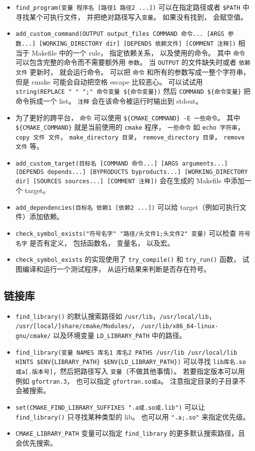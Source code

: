 \begin{itemize}
\item \verb`find_program(变量 程序名 [路径1 路径2 ...])` 可以在指定路径或者 \verb`$PATH` 中寻找某个可执行文件， 并把绝对路径写入\verb`变量`。 如果没有找到， 会赋空值。
\item \verb`add_custom_command(OUTPUT output_files COMMAND 命令... [ARGS 参数...] [WORKING_DIRECTORY dir] [DEPENDS 依赖文件] [COMMENT 注释])` 相当于 Makefile 中的一个 rule， 指定依赖关系， 以及使用的命令。 其中 \verb`命令` 可以包含完整的命令而不需要额外用 \verb`参数`。 当 \verb`OUTPUT` 的文件缺失时或者 \verb`依赖文件` 更新时， 就会运行命令。 可以把 \verb`命令` 和所有的参数写成一整个字符串， 但是 cmake 可能会自动把空格 escape 比较恶心。 可以试试用 \verb`string(REPLACE " " ";" 命令变量 ${命令变量})` 然后 \verb`COMMAND ${命令变量}` 把命令拆成一个 list。 \verb`注释` 会在该命令被运行时输出到 stdout。
\item 为了更好的跨平台， \verb`命令` 可以使用 \verb`${CMAKE_COMMAND} -E 一些命令`。 其中 \verb`${CMAKE_COMMAND}` 就是当前使用的 \verb`cmake` 程序， \verb`一些命令` 如 \verb`echo 字符串`，\verb`copy 文件 文件`， \verb`make_directory 目录`， \verb`remove_directory 目录`， \verb`remove 文件` 等。
\item \verb`add_custom_target(目标名 [COMMAND 命令...] [ARGS arguments...] [DEPENDS depends...] [BYPRODUCTS byproducts...] [WORKING_DIRECTORY dir] [SOURCES sources...] [COMMENT 注释])` 会在生成的 Makefile 中添加一个 target。
\item \verb`add_dependencies(目标名 依赖1 [依赖2 ...])` 可以给 target（例如可执行文件）添加依赖。
\item \verb`check_symbol_exists("符号名字" "路径/头文件1;头文件2" 变量)` 可以检查 \verb`符号名字` 是否有定义， 包括函数名， 变量名， 以及宏。
\item \verb`check_symbol_exists` 的实现使用了 \verb`try_compile()` 和 \verb`try_run()` 函数， 试图编译和运行一个测试程序， 从运行结果来判断是否存在符号。
\end{itemize}

\subsection{链接库}
\begin{itemize}
\item \verb`find_library()` 的默认搜索路径如 \verb`/usr/lib`，\verb`/usr/local/lib`， \verb`/usr/[local/]share/cmake/Modules/`， \verb`/usr/lib/x86_64-linux-gnu/cmake/` 以及环境变量 \verb`LD_LIBRARY_PATH` 中的路径。
\item \verb`find_library(变量 NAMES 库名1 库名2 PATHS /usr/lib /usr/local/lib HINTS $ENV{LIBRARY_PATH} $ENV{LD_LIBRARY_PATH})` 可以寻找 \verb`lib库名.so或a[.版本号]`，然后把路径写入 \verb`变量`（不做其他事情）。 若要指定版本可以用例如 \verb`gfortran.3`， 也可以指定 \verb`gfortran.so或a`。 注意指定目录的子目录不会被搜索。
\item \verb`set(CMAKE_FIND_LIBRARY_SUFFIXES ".a或.so或.lib")` 可以让 \verb`find_library()` 只寻找某种类型的 lib。 也可以用 \verb`".a;.so"` 来指定优先级。
\item \verb`CMAKE_LIBRARY_PATH` 变量可以指定 \verb`find_library` 的更多默认搜索路径，且会优先搜索。
\end{itemize}

